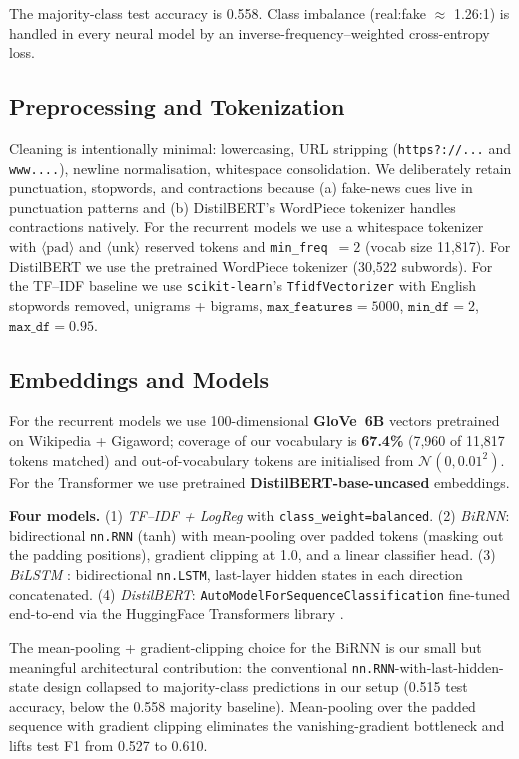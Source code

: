 \documentclass{article}
\begin{document}
The majority-class test accuracy is 0.558. Class imbalance (real:fake $\approx$ 1.26:1) is handled in every neural model by an inverse-frequency--weighted cross-entropy loss.

\subsection{Preprocessing and Tokenization}
Cleaning is intentionally minimal: lowercasing, URL stripping (\texttt{https?://...} and \texttt{www....}), newline normalisation, whitespace consolidation. We deliberately retain punctuation, stopwords, and contractions because (a) fake-news cues live in punctuation patterns and (b) DistilBERT's WordPiece tokenizer handles contractions natively. For the recurrent models we use a whitespace tokenizer with $\langle\text{pad}\rangle$ and $\langle\text{unk}\rangle$ reserved tokens and \texttt{min\_freq}~$=2$ (vocab size 11{,}817). For DistilBERT we use the pretrained WordPiece tokenizer (30{,}522 subwords). For the TF--IDF baseline we use \texttt{scikit-learn}'s \texttt{TfidfVectorizer} with English stopwords removed, unigrams + bigrams, $\texttt{max\_features}=5000$, $\texttt{min\_df}=2$, $\texttt{max\_df}=0.95$.

\subsection{Embeddings and Models}
For the recurrent models we use 100-dimensional \textbf{GloVe~6B} vectors \citep{pennington2014glove} pretrained on Wikipedia + Gigaword; coverage of our vocabulary is \textbf{67.4\%} (7{,}960 of 11{,}817 tokens matched) and out-of-vocabulary tokens are initialised from $\mathcal{N}(0, 0.01^2)$. For the Transformer we use pretrained \textbf{DistilBERT-base-uncased} \citep{sanh2019distilbert} embeddings.

\textbf{Four models.} (1) \emph{TF--IDF + LogReg} with \texttt{class\_weight=balanced}. (2) \emph{BiRNN}: bidirectional \texttt{nn.RNN} (tanh) with mean-pooling over padded tokens (masking out the padding positions), gradient clipping at 1.0, and a linear classifier head. (3) \emph{BiLSTM} \citep{hochreiter1997lstm}: bidirectional \texttt{nn.LSTM}, last-layer hidden states in each direction concatenated. (4) \emph{DistilBERT}: \texttt{AutoModelForSequenceClassification} fine-tuned end-to-end via the HuggingFace Transformers library \citep{wolf2020transformers}.

The mean-pooling + gradient-clipping choice for the BiRNN is our small but meaningful architectural contribution: the conventional \texttt{nn.RNN}-with-last-hidden-state design collapsed to majority-class predictions in our setup (0.515 test accuracy, below the 0.558 majority baseline). Mean-pooling over the padded sequence with gradient clipping eliminates the vanishing-gradient bottleneck and lifts test F1 from 0.527 to 0.610.
\end{document}
